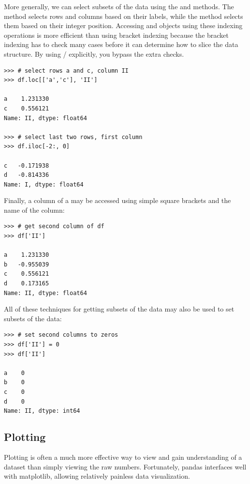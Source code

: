 More generally, we can select subsets of the data using the  and  methods.
The  method selects rows and columns based on their labels, while the  method
selects them based on their integer position.
Accessing  and  objects using these indexing operations is more efficient than using bracket indexing because the bracket indexing has to check many cases before it can determine how to slice the data structure.
By using / explicitly, you bypass the extra checks.
\begin{lstlisting}
>>> # select rows a and c, column II
>>> df.loc[['a','c'], 'II']

a    1.231330
c    0.556121
Name: II, dtype: float64

>>> # select last two rows, first column
>>> df.iloc[-2:, 0]

c   -0.171938
d   -0.814336
Name: I, dtype: float64
\end{lstlisting}
Finally, a column of a  may be accessed using simple square brackets and the name of the column:
\begin{lstlisting}
>>> # get second column of df
>>> df['II']

a    1.231330
b   -0.955039
c    0.556121
d    0.173165
Name: II, dtype: float64
\end{lstlisting}

All of these techniques for getting subsets of the data may also be used to set subsets of the data:
\begin{lstlisting}
>>> # set second columns to zeros
>>> df['II'] = 0
>>> df['II']

a    0
b    0
c    0
d    0
Name: II, dtype: int64
\end{lstlisting}

\subsection*{Plotting}
Plotting is often a much more effective way to view and gain understanding of a dataset than simply
viewing the raw numbers. Fortunately, pandas interfaces well with matplotlib, allowing relatively
painless data visualization.

